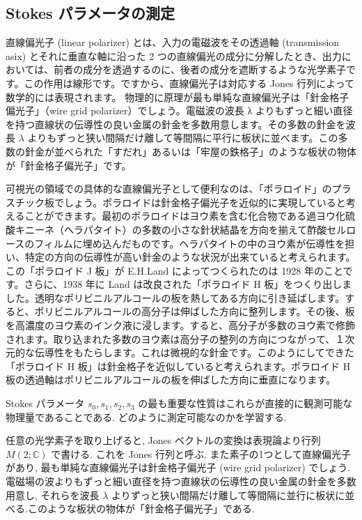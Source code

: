 \documentclass[uplatex,dvipdfmx,a4paper,11pt]{jlreq}
\newcommand{\CC}{\mathbb{C}}
\theoremstyle{definition}
\begin{document}
\subsection{Stokes パラメータの測定}
\begin{definition}[光学素子]
  直線偏光子 (linear polarizer) とは、入力の電磁波をその透過軸 (transmission asix) とそれに垂直な軸に沿った 2 つの直線偏光の成分に分解したとき、出力においては、前者の成分を透過するのに、後者の成分を遮断するような光学素子です。この作用は線形です。ですから、直線偏光子は対応する Jones 行列によって数学的には表現されます。
  物理的に原理が最も単純な直線偏光子は「針金格子偏光子」（wire grid polarizer）でしょう。電磁波の波長 λ よりもずっと細い直径を持つ直線状の伝導性の良い金属の針金を多数用意します。その多数の針金を波長 $\lambda$ よりもずっと狭い間隔だけ離して等間隔に平行に板状に並べます。この多数の針金が並べられた「すだれ」あるいは「牢屋の鉄格子」のような板状の物体が「針金格子偏光子」です。
\end{definition}

可視光の領域での具体的な直線偏光子として便利なのは、「ポラロイド」のプラスチック板でしょう。ポラロイドは針金格子偏光子を近似的に実現していると考えることができます。最初のポラロイドはヨウ素を含む化合物である過ヨウ化硫酸キニーネ（ヘラパタイト）の多数の小さな針状結晶を方向を揃えて酢酸セルロースのフィルムに埋め込んだものです。ヘラパタイトの中のヨウ素が伝導性を担い、特定の方向の伝導性が高い針金のような状況が出来ていると考えられます。この「ポラロイド J 板」が E.H.Land によってつくられたのは 1928 年のことです。さらに、1938 年に Land は改良された「ポラロイド H 板」をつくり出しました。透明なポリビニルアルコールの板を熱してある方向に引き延ばします。すると、ポリビニルアルコールの高分子は伸ばした方向に整列します。その後、板を高濃度のヨウ素のインク液に浸します。すると、高分子が多数のヨウ素で修飾されます。取り込まれた多数のヨウ素は高分子の整列の方向につながって、１次元的な伝導性をもたらします。これは微視的な針金です。このようにしてできた「ポラロイド H 板」は針金格子を近似していると考えられます。ポラロイド H 板の透過軸はポリビニルアルコールの板を伸ばした方向に垂直になります。

Stokes パラメータ $s_0, s_1, s_2, s_3$ の最も重要な性質はこれらが直接的に観測可能な物理量であることである. どのように測定可能なのかを学習する.

任意の光学素子を取り上げると, Jones ベクトルの変換は表現論より行列 $M(2; \CC)$ で書ける. これを Jones 行列と呼ぶ. また素子の1つとして直線偏光子があり, 最も単純な直線偏光子は針金格子偏光子 (wire grid polarizer) でしょう. 電磁場の波よりもずっと細い直径を持つ直線状の伝導性の良い金属の針金を多数用意し, それらを波長 $\lambda$ よりずっと狭い間隔だけ離して等間隔に並行に板状に並べる.このような板状の物体が「針金格子偏光子」である. \\
\end{document}
